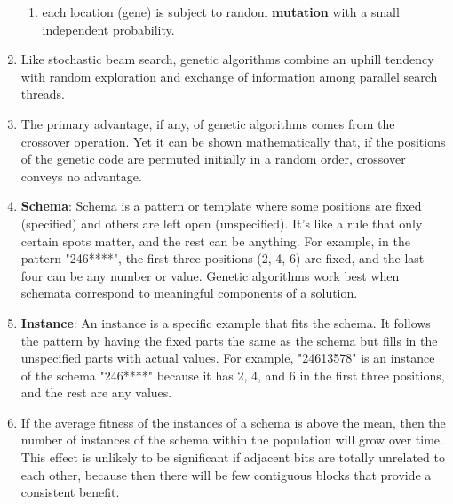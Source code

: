 \begin{enumerate}
\begin{enumerate}
        \item each location (gene) is subject to random \textbf{mutation} with a small independent probability.
        \hfill \cite{ai/book/Artificial-Intelligence-A-Modern-Approach/Russell-Norvig}
    \end{enumerate}

    \item Like stochastic beam search, genetic algorithms combine an uphill tendency with random exploration and exchange of information among parallel search threads.
    \hfill \cite{ai/book/Artificial-Intelligence-A-Modern-Approach/Russell-Norvig}

    \item The primary advantage, if any, of genetic algorithms comes from the crossover operation.
    Yet it can be shown mathematically that, if the positions of the genetic code are permuted initially in a random order, crossover conveys no advantage.
    \hfill \cite{ai/book/Artificial-Intelligence-A-Modern-Approach/Russell-Norvig}

    \item \textbf{Schema}: Schema is a pattern or template where some positions are fixed (specified) and others are left open (unspecified).
    It's like a rule that only certain spots matter, and the rest can be anything.
    For example, in the pattern "246****", the first three positions (2, 4, 6) are fixed, and the last four can be any number or value.
    Genetic algorithms work best when schemata correspond to meaningful components of a solution.
    \hfill \cite{ai/book/Artificial-Intelligence-A-Modern-Approach/Russell-Norvig, common/online/chatgpt}

    \item \textbf{Instance}: An instance is a specific example that fits the schema.
    It follows the pattern by having the fixed parts the same as the schema but fills in the unspecified parts with actual values.
    For example, "24613578" is an instance of the schema "246****" because it has 2, 4, and 6 in the first three positions, and the rest are any values.
    \hfill \cite{ai/book/Artificial-Intelligence-A-Modern-Approach/Russell-Norvig, common/online/chatgpt}

    \item If the average fitness of the instances of a schema is above the mean, then the number of instances of the schema within the population will grow over time.
    This effect is unlikely to be significant if adjacent bits are totally unrelated to each other, because then there will be few contiguous blocks that provide a consistent benefit.
    \hfill \cite{ai/book/Artificial-Intelligence-A-Modern-Approach/Russell-Norvig}
\end{enumerate}




